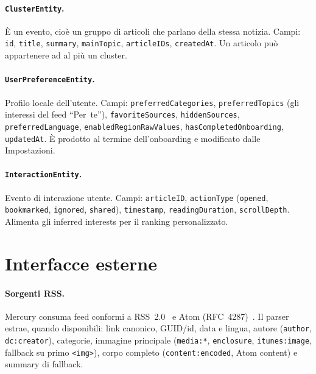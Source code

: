 \paragraph{\texttt{ClusterEntity}.} È un evento, cioè un gruppo di
articoli che parlano della stessa notizia. Campi: \texttt{id}, \texttt{title},
\texttt{summary}, \texttt{mainTopic}, \texttt{articleIDs}, \texttt{createdAt}.
Un articolo può appartenere ad al più un cluster.

\paragraph{\texttt{UserPreferenceEntity}.} Profilo locale dell'utente. Campi:
\texttt{preferredCategories}, \texttt{preferredTopics} (gli interessi del
feed ``Per~te''), \texttt{favoriteSources}, \texttt{hiddenSources},
\texttt{preferredLanguage}, \texttt{enabledRegionRawValues},
\texttt{hasCompletedOnboarding}, \texttt{updatedAt}. È prodotto al termine
dell'onboarding e modificato dalle Impostazioni.

\paragraph{\texttt{InteractionEntity}.} Evento di interazione utente. Campi:
\texttt{articleID}, \texttt{actionType} (\texttt{opened},
\texttt{bookmarked}, \texttt{ignored}, \texttt{shared}), \texttt{timestamp},
\texttt{readingDuration}, \texttt{scrollDepth}. Alimenta gli inferred interests
per il ranking personalizzato.

\section{Interfacce esterne}
\paragraph{Sorgenti RSS.} Mercury consuma feed conformi a
RSS~2.0~\cite{rssboard2009} e Atom (RFC~4287)~\cite{rfc4287}. Il parser estrae, quando disponibili: link canonico, GUID/id,
data e lingua, autore (\texttt{author}, \texttt{dc:creator}), categorie,
immagine principale (\texttt{media:*}, \texttt{enclosure}, \texttt{itunes:image},
fallback su primo \texttt{<img>}), corpo completo (\texttt{content:encoded},
Atom content) e summary di fallback.

